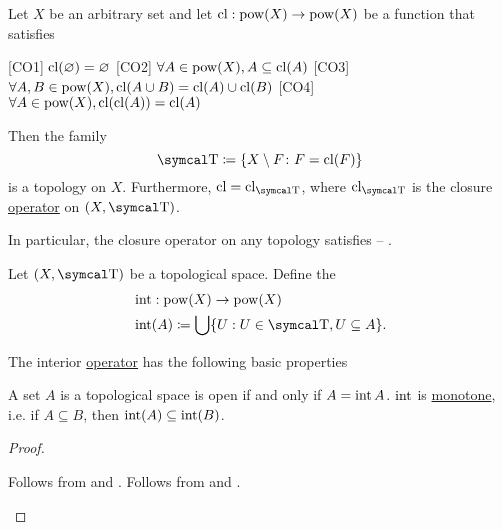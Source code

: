 \begin{proposition}\label{thm:closure_operator_axioms}\cite[14]{Engelking1989}
  Let \( X \) be an arbitrary set and let \( \operatorname{cl}: \operatorname{pow}(X) \to \operatorname{pow}(X) \) be a function that satisfies
  \begin{description}
    [CO1] \( \operatorname{cl}(\varnothing) = \varnothing \)
    [CO2] \( \forall A \in \operatorname{pow}(X), A \subseteq \operatorname{cl}(A) \)
    [CO3] \( \forall A, B \in \operatorname{pow}(X), \operatorname{cl}(A \cup B) = \operatorname{cl}(A) \cup \operatorname{cl}(B) \)
    [CO4] \( \forall A \in \operatorname{pow}(X), \operatorname{cl}(\operatorname{cl}(A)) = \operatorname{cl}(A) \)
  \end{description}

  Then the family
  \begin{equation*}
    \CT \coloneqq \{ X \setminus F \colon F = \Cl(F) \}
  \end{equation*}
  is a topology on \( X \). Furthermore, \( \Cl = \Cl_{\CT} \), where \( \Cl_{\CT} \) is the closure \hyperref[def:closure_operator]{operator} on \( (X, \CT) \).

  In particular, the closure operator on any topology satisfies  -- .
\end{proposition}

\begin{definition}\label{def:interior_operator}\cite[15]{Engelking1989}
  Let \( (X, \CT) \) be a topological space. Define the 
  \begin{align*}
    &\Int: \Pow(X) \to \Pow(X) \\
    &\Int(A) \coloneqq \bigcup \{ U : U \in \CT, U \subseteq A \}.
  \end{align*}
\end{definition}

\begin{proposition}\label{thm:interior_operator_properties}
  The interior \hyperref[def:interior_operator]{operator} has the following basic properties
  \begin{propenum}
     A set \( A \) is a topological space is open if and only if \( A = \operatorname{int} A \).
     \( \operatorname{int} \) is \hyperref[def:monotone_map]{monotone}, i.e. if \( A \subseteq B \), then \( \operatorname{int}(A) \subseteq \operatorname{int}(B) \).
  \end{propenum}
\end{proposition}
\begin{proof}\mbox{}
  \begin{description}
     Follows from  and .
     Follows from  and .
  \end{description}
\end{proof}

